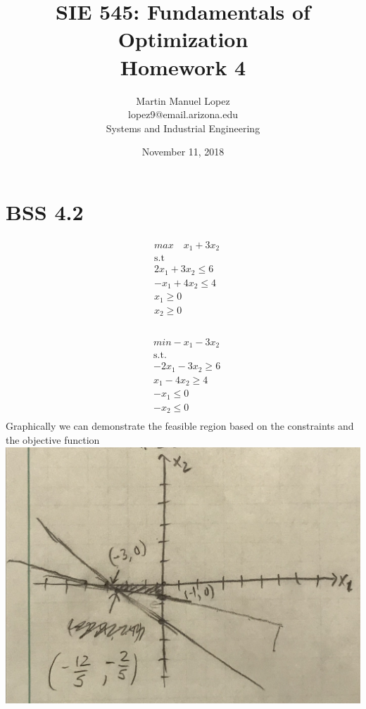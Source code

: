 \documentclass[12pt]{article}
\begin{document}
\title{SIE 545: Fundamentals of Optimization \\Homework 4}
\author{Martin Manuel Lopez \\lopez9@email.arizona.edu \\Systems and Industrial Engineering}
\date{November 11, 2018}
\maketitle
\section{BSS 4.2}   
    \begin{align*}
        &max \quad x_1+3x_2 \\
        &\text{s.t} \\
        &2x_1 + 3x_2 \leq 6\\
        &-x_1 + 4x_2 \leq 4\\
        &x_1 \geq 0\\
        &x_2 \geq 0\\
    \end{align*}
    \\
    \begin{align*}
        &min -x_1 - 3x_2\\
        &\text{s.t.}\\
        &-2x_1-3x_2 \geq 6\\
        &x_1 -4x_2 \geq 4\\
        &-x_1 \leq 0 \\
        &-x_2 \leq 0\\
    \end{align*}
Graphically we can demonstrate the feasible region based on the constraints and the objective function\\
    \includegraphics[width=\textwidth]{BSS4-2.jpeg}\\
\end{document}
